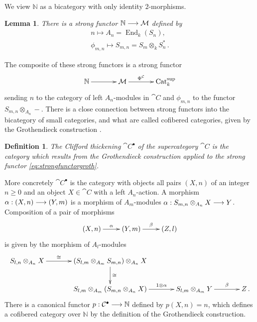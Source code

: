 \documentclass[english,letter paper,12pt,leqno]{article}
\newtheorem{lemma}[theorem]{Lemma}
\theoremstyle{example}
\newtheorem{definition}[theorem]{Definition}
\numberwithin{equation}{section}
\DeclareMathOperator{\End}{End}
\DeclareMathOperator{\Cat}{Cat}
\begin{document}
We view $\mathbb{N}$ as a bicategory with only identity $2$-morphisms.

\begin{lemma} There is a strong functor $\mathbb{N} \longrightarrow \mathcal{M}$ defined by
\begin{gather*}
n \mapsto A_n = \End_k( S_n ),\\
\phi_{m,n} \mapsto S_{m,n} = S_m \otimes_k S_n^*\,.
\end{gather*}
\end{lemma}

The composite of these strong functors is a strong functor
\begin{equation}\label{eq:strongfunctorgroth}
\xymatrix@C+1pc{
\mathbb{N} \ar[r] & \cat{M} \ar[r]^-{\Phi^{\cat{C}}} & \Cat^{\operatorname{sup}}_k
}
\end{equation}
sending $n$ to the category of left $A_n$-modules in $\cat{C}$ and $\phi_{m,n}$ to the functor $S_{m,n} \otimes_{A_n} -$. There is a close connection between strong functors into the bicategory of small categories, and what are called cofibered categories, given by the Grothendieck construction \cite{vistoli}.

\begin{definition} The \emph{Clifford thickening} $\cat{C}^\bullet$ of the supercategory $\cat{C}$ is the category which results from the Grothendieck construction applied to the strong functor \eqref{eq:strongfunctorgroth}.
\end{definition}

More concretely $\cat{C}^\bullet$ is the category with objects all pairs $(X,n)$ of an integer $n \ge 0$ and an object $X \in \cat{C}$ with a left $A_n$-action. A morphism $\alpha: (X,n) \longrightarrow (Y,m)$ is a morphism of $A_m$-modules $\alpha: S_{m,n} \otimes_{A_n} X \longrightarrow Y$. Composition of a pair of morphisms
\begin{equation}\label{eq:comp_chain0}
\xymatrix{
(X,n) \ar[r]^-{\alpha} & (Y,m) \ar[r]^-{\beta} & (Z,l)
}
\end{equation}
is given by the morphism of $A_l$-modules
\begin{equation}\label{eq:comp_chain1}
\xymatrix@C+1pc{
S_{l, n} \otimes_{A_n} X \ar[r]^-{\cong} & (S_{l,m} \otimes_{A_m} S_{m,n}) \otimes_{A_n} X \ar[d]^-{\cong}\\
& S_{l,m} \otimes_{A_m} ( S_{m,n} \otimes_{A_n} X ) \ar[r]^-{ 1 \otimes \alpha } & S_{l,m} \otimes_{A_m} Y \ar[r]^-{\beta} & Z\,.
}
\end{equation}
There is a canonical functor $p: \mathcal{C}^\bullet \longrightarrow \mathbb{N}$ defined by $p(X,n) = n$, which defines a cofibered category over $\mathbb{N}$ by the definition of the Grothendieck construction.
\end{document}
